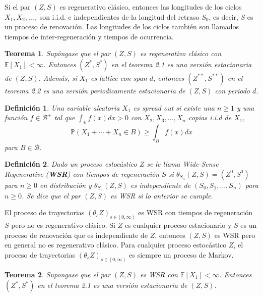 \documentclass{article}
\newtheorem{Def}{Definición}
\newtheorem{Teo}{Teorema}
\newcommand{\rea}{\mathbb{R}}
\newcommand{\esp}{\mathbb{E}}
\newcommand{\prob}{\mathbb{P}}
\begin{document}
Si el par $\left(Z,S\right)$ es regenerativo cl\'asico, entonces las longitudes de los ciclos $X_{1},X_{2},\ldots,$ son i.i.d. e independientes de la longitud del retraso $S_{0}$, es decir, $S$ es un proceso de renovaci\'on. Las longitudes de los ciclos tambi\'en son llamados tiempos de inter-regeneraci\'on y tiempos de ocurrencia.

\begin{Teo}
Sup\'ongase que el par $\left(Z,S\right)$ es regenerativo cl\'asico con $\esp\left[X_{1}\right]<\infty$. Entonces $\left(Z^{*},S^{*}\right)$ en el teorema 2.1 es una versi\'on estacionaria de $\left(Z,S\right)$. Adem\'as, si $X_{1}$ es lattice con span $d$, entonces $\left(Z^{**},S^{**}\right)$ en el teorema 2.2 es una versi\'on periodicamente estacionaria de $\left(Z,S\right)$ con periodo $d$.
\end{Teo}

\begin{Def}
Una variable aleatoria $X_{1}$ es \textit{spread out} si existe una $n\geq1$ y una  funci\'on $f\in\mathcal{B}^{+}$ tal que $\int_{\rea}f\left(x\right)dx>0$ con $X_{2},X_{3},\ldots,X_{n}$ copias i.i.d  de $X_{1}$, $$\prob\left(X_{1}+\cdots+X_{n}\in B\right)\geq\int_{B}f\left(x\right)dx$$ para $B\in\mathcal{B}$.
\end{Def}

\begin{Def}
Dado un proceso estoc\'astico $Z$ se le llama \textit{Wide-Sense Regenerative} (\textbf{WSR}) con tiempos de regeneraci\'on $S$ si $\theta_{S_{n}}\left(Z,S\right)=\left(Z^{0},S^{0}\right)$ para $n\geq0$ en distribuci\'on y $\theta_{S_{n}}\left(Z,S\right)$ es independiente de $\left(S_{0},S_{1},\ldots,S_{n}\right)$ para $n\geq0$. Se dice que el par $\left(Z,S\right)$ es WSR si lo anterior se cumple.
\end{Def}

El proceso de trayectorias $\left(\theta_{s}Z\right)_{s\in\left[0,\infty\right)}$ es WSR con tiempos de regeneraci\'on $S$ pero no es regenerativo cl\'asico. Si $Z$ es cualquier proceso estacionario y $S$ es un proceso de renovaci\'on que es independiente de $Z$, entonces $\left(Z,S\right)$ es WSR pero en general no es regenerativo cl\'asico. Para cualquier proceso estoc\'astico $Z$, el proceso de trayectorias $\left(\theta_{s}Z\right)_{s\in\left[0,\infty\right)}$ es siempre un proceso de Markov.

\begin{Teo}
Supongase que el par $\left(Z,S\right)$ es WSR con $\esp\left[X_{1}\right]<\infty$. Entonces $\left(Z^{*},S^{*}\right)$ en el teorema 2.1 es una versi\'on estacionaria de 
$\left(Z,S\right)$.
\end{Teo}
\end{document}
